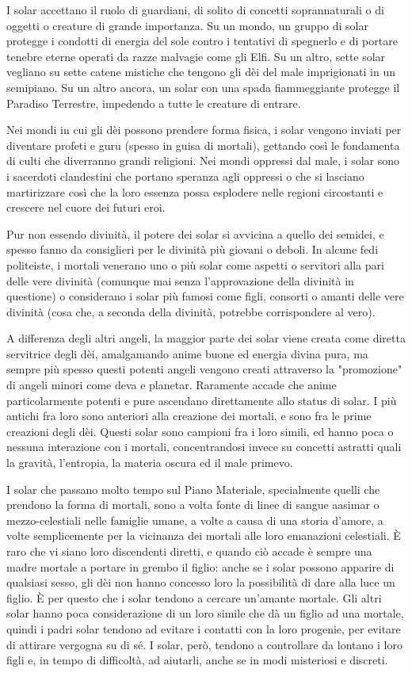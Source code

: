 \begin{multicols}{2}
I solar accettano il ruolo di guardiani, di solito di concetti soprannaturali o di oggetti o creature di grande importanza. Su un mondo, un gruppo di solar protegge i condotti di energia del sole contro i tentativi di spegnerlo e di portare tenebre eterne operati da razze malvagie come gli Elfi. Su un altro, sette solar vegliano su sette catene mistiche che tengono gli dèi del male imprigionati in un semipiano. Su un altro ancora, un solar con una spada fiammeggiante protegge il Paradiso Terrestre, impedendo a tutte le creature di entrare.

Nei mondi in cui gli dèi possono prendere forma fisica, i solar vengono inviati per diventare profeti e guru (spesso in guisa di mortali), gettando così le fondamenta di culti che diverranno grandi religioni. Nei mondi oppressi dal male, i solar sono i sacerdoti clandestini che portano speranza agli oppressi o che si lasciano martirizzare così che la loro essenza possa esplodere nelle regioni circostanti e crescere nel cuore dei futuri eroi.

Pur non essendo divinità, il potere dei solar si avvicina a quello dei semidei, e spesso fanno da consiglieri per le divinità più giovani o deboli. In alcune fedi politeiste, i mortali venerano uno o più solar come aspetti o servitori alla pari delle vere divinità (comunque mai senza l'approvazione della divinità in questione) o considerano i solar più famosi come figli, consorti o amanti delle vere divinità (cosa che, a seconda della divinità, potrebbe corrispondere al vero).

A differenza degli altri angeli, la maggior parte dei solar viene creata come diretta servitrice degli dèi, amalgamando anime buone ed energia divina pura, ma sempre più spesso questi potenti angeli vengono creati attraverso la "promozione" di angeli minori come deva e planetar. Raramente accade che anime particolarmente potenti e pure ascendano direttamente allo status di solar. I più antichi fra loro sono anteriori alla creazione dei mortali, e sono fra le prime creazioni degli dèi. Questi solar sono campioni fra i loro simili, ed hanno poca o nessuna interazione con i mortali, concentrandosi invece su concetti astratti quali la gravità, l'entropia, la materia oscura ed il male primevo.

I solar che passano molto tempo sul Piano Materiale, specialmente quelli che prendono la forma di mortali, sono a volta fonte di linee di sangue aasimar o mezzo-celestiali nelle famiglie umane, a volte a causa di una storia d'amore, a volte semplicemente per la vicinanza dei mortali alle loro emanazioni celestiali. È raro che vi siano loro discendenti diretti, e quando ciò accade è sempre una madre mortale a portare in grembo il figlio: anche se i solar possono apparire di qualsiasi sesso, gli dèi non hanno concesso loro la possibilità di dare alla luce un figlio. È per questo che i solar tendono a cercare un'amante mortale. Gli altri solar hanno poca considerazione di un loro simile che dà un figlio ad una mortale, quindi i padri solar tendono ad evitare i contatti con la loro progenie, per evitare di attirare vergogna su di sé. I solar, però, tendono a controllare da lontano i loro figli e, in tempo di difficoltà, ad aiutarli, anche se in modi misteriosi e discreti.


\end{multicols}
